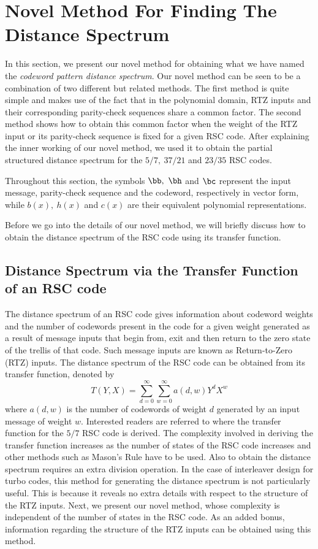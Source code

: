 \section{Novel Method For Finding The Distance Spectrum}
\label{sec5}
In this section, we present our novel method for obtaining what we have named the \textit{codeword pattern distance spectrum}. Our novel method can be seen to be a combination of two different but related methods. The first method is quite simple and makes use of the fact that in the polynomial domain, RTZ inputs and their corresponding parity-check sequences share a common factor. 
The second method shows how to obtain this common factor when the weight of the RTZ input or its parity-check sequence is fixed for a given RSC code. 
After explaining the inner working of our novel method, we used it to obtain the partial structured distance spectrum for the $5/7,~ 37/21$ and $23/35$  RSC codes.

Throughout this section, the symbols $\bb,~\bh$ and $\bc$ represent the input message, parity-check sequence and the codeword, respectively in vector form, while $b(x),~h(x)$ and $c(x)$ are their equivalent polynomial representations. 

Before we go into the details of our novel method, we will briefly discuss how to obtain the distance spectrum of the RSC code using its transfer function. 

\subsection{Distance Spectrum via the Transfer Function of an RSC code}
The distance spectrum of an RSC code gives information about codeword weights and the number of codewords present in the code for a given weight generated as a result of message inputs that begin from, exit and then return to the zero state of the trellis of that code. Such message inputs are known as Return-to-Zero (RTZ) inputs. The distance spectrum of the RSC code can be obtained from its transfer function, denoted by $$T(Y,X)=\sum_{d=0}^{\infty}\sum_{w=0}^{\infty} a(d,w)Y^dX^w$$ where $a(d,w)$ is the number of codewords of weight $d$ generated by an input message of weight $w$.
Interested readers are referred to \cite{ref3} where the transfer function for the $5/7$ RSC code is derived.
The complexity involved in deriving the transfer function increases as the number of states of the RSC code increases and other methods such as Mason's Rule \cite{ref3} have to be used. Also to obtain the distance spectrum requires an extra division operation. In the case of interleaver design for turbo codes, this method for generating the distance spectrum is not particularly useful. This is because it reveals no extra details with respect to the structure of the RTZ inputs. 
Next, we present our novel method, whose complexity is independent of the number of states in the RSC code. As an added bonus, information regarding the structure of the RTZ inputs can be obtained using this method.


